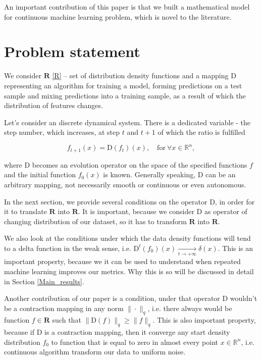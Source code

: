 \documentclass{article}
\begin{document}
    An important contribution of this paper is that  we built a mathematical model for continuous machine learning problem, which is novel to the literature.

\section{Problem statement} \label{Problem_statement}

    We consider $\mathbf{R}$ \eqref{R} -- set of distribution density functions and a mapping $\text{D}$ representing an algorithm for training a model, forming predictions on a test sample and mixing predictions into a training sample, as a result of which the distribution of features changes.

    Let's consider an discrete dynamical system. There is a dedicated variable - the step number, which increases, at step $t$ and $t+1$ of which the ratio is fulfilled

    \begin{equation*}
        f_{t+1}(x) = \text{D}(f_t)(x), \quad \text{for}~ \forall x \in \mathbb{R}^n,
    \end{equation*}

    where $\text{D}$ becomes an evolution operator on the space of the specified functions $f$ and the initial function $f_0(x)$ is known. Generally speaking, $\text{D}$ can be an arbitrary mapping, not necessarily smooth or continuous or even autonomous.

    In the next section, we provide several conditions on the operator $\text{D}$, in order for it to translate $\mathbf{R}$ into $\mathbf{R}$. It is important, because we consider $\text{D}$ as operator of changing distribution of our dataset, so it has to transform $\mathbf{R}$ into $\mathbf{R}$.

    We also look at the conditions under which the data density functions will tend to a delta function in the weak sense, i.e. $\text{D}^t(f_0)(x) \underset{t \to +\infty}{\longrightarrow} \delta(x)$. 
    This is an important property, because we it can be used to understand when repeated machine learning improves our metrics. Why this is so will be discussed in detail in Section \ref{Main_results}.

    Another contribution of our paper is a condition, under that operator $\text{D}$ wouldn't be a contraction mapping in any norm $\|\cdot\|_q$, i.e. there always would be function $f \in \mathbf{R}$ such that $\|\text{D}(f)\|_q \geq \|f\|_q$. This is also important property, because if $\text{D}$ is a contraction mapping, then it converge any start density distribution $f_0$ to function that is equal to zero in almost every point $x \in \mathbb{R}^n$, i.e. continuous algorithm transform our data to uniform noise.
\end{document}
